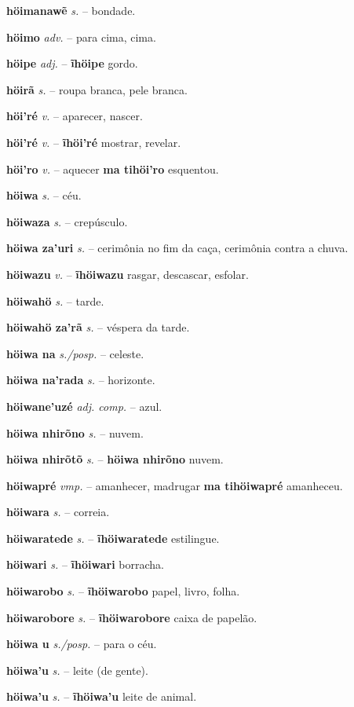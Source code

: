 \textbf{höimanawẽ} \textit{s.} -- bondade.

\textbf{höimo} \textit{adv.} -- para cima, cima.

\textbf{höipe} \textit{adj.} -- \textbf{ĩhöipe} gordo.

\textbf{höirã} \textit{s.} -- roupa branca, pele branca.

\textbf{höi'ré} \textit{v.} -- aparecer, nascer.

\textbf{höi'ré} \textit{v.} -- \textbf{ĩhöi'ré} mostrar, revelar.

\textbf{höi'ro} \textit{v.} -- aquecer  \textbf{ma tihöi'ro} esquentou.

\textbf{höiwa} \textit{s.} -- céu.

\textbf{höiwaza} \textit{s.} -- crepúsculo.

\textbf{höiwa za'uri} \textit{s.} -- cerimônia no fim da caça, cerimônia contra a chuva.

\textbf{höiwazu} \textit{v.} -- \textbf{ĩhöiwazu} rasgar, descascar, esfolar.

\textbf{höiwahö} \textit{s.} -- tarde.

\textbf{höiwahö za'rã} \textit{s.} -- véspera da tarde.

\textbf{höiwa na} \textit{s./posp.} -- celeste.

\textbf{höiwa na'rada} \textit{s.} -- horizonte.

\textbf{höiwane'uzé} \textit{adj. comp.} -- azul.

\textbf{höiwa nhirõno} \textit{s.} -- nuvem.

\textbf{höiwa nhirõtõ} \textit{s.} -- \textbf{höiwa nhirõno} nuvem.

\textbf{höiwapré} \textit{vmp.} -- amanhecer, madrugar  \textbf{ma tihöiwapré} amanheceu.

\textbf{höiwara} \textit{s.} -- correia.

\textbf{höiwaratede} \textit{s.} -- \textbf{ĩhöiwaratede} estilingue.

\textbf{höiwari} \textit{s.} -- \textbf{ĩhöiwari} borracha.

\textbf{höiwarobo} \textit{s.} -- \textbf{ĩhöiwarobo} papel, livro, folha.

\textbf{höiwarobore} \textit{s.} -- \textbf{ĩhöiwarobore} caixa de papelão.

\textbf{höiwa u} \textit{s./posp.} -- para o céu.

\textbf{höiwa'u} \textit{s.} -- leite (de gente).

\textbf{höiwa'u} \textit{s.} -- \textbf{ĩhöiwa'u} leite de animal.

